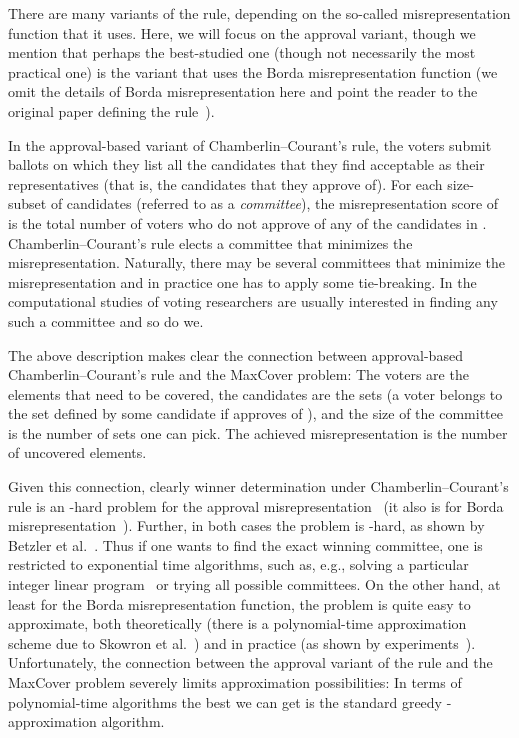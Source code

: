 \documentclass[11pt]{article}
\begin{document}
There are many variants of the rule, depending on the so-called
misrepresentation function that it uses. Here, we will focus on the
approval variant, though we mention that perhaps the best-studied one
(though not necessarily the most practical one) is the variant that
uses the Borda misrepresentation function (we omit the details of
Borda misrepresentation here and point the reader to the original
paper defining the rule~\cite{ccElection}).

In the approval-based variant of Chamberlin--Courant's rule, the
voters submit ballots on which they list all the candidates that they
find acceptable as their representatives (that is, the candidates that
they approve of). For each size- subset  of candidates (referred
to as a \emph{committee}), the misrepresentation score of  is the
total number of voters who do not approve of any of the candidates in
. Chamberlin--Courant's rule elects a committee  that minimizes
the misrepresentation.  Naturally, there may be several committees
that minimize the misrepresentation and in practice one has to apply
some tie-breaking. In the computational studies of voting researchers
are usually interested in finding any such a committee and so do we.

The above description makes clear the connection between
approval-based Chamberlin--Courant's rule and the MaxCover problem:
The voters are the elements that need to be covered, the candidates
are the sets (a voter  belongs to the set defined by some candidate
 if  approves of ), and the size of the committee is the
number of sets one can pick. The achieved misrepresentation is the
number of uncovered elements.

Given this connection, clearly winner determination under
Chamberlin--Courant's rule is an -hard problem for the approval
misrepresentation~\cite{complexityProportionalRepr} (it also is for
Borda misrepresentation~\cite{budgetSocialChoice}). Further, in both
cases the problem is -hard, as shown by Betzler et
al.~\cite{fullyProportionalRepr}.  Thus if one wants to find the exact
winning committee, one is restricted to exponential time algorithms,
such as, e.g., solving a particular integer linear
program~\cite{potthoff-brams} or trying all possible committees.  On
the other hand, at least for the Borda misrepresentation function, the
problem is quite easy to approximate, both theoretically (there is a
polynomial-time approximation scheme due to Skowron et
al.~\cite{sko-fal-sli:c:multiwinner}) and in practice (as shown by
experiments~\cite{sko-fal-sli:c:monroe-cc-experimental}).
Unfortunately, the connection between the approval variant of the rule
and the MaxCover problem severely limits approximation possibilities:
In terms of polynomial-time algorithms the best we can get is the
standard greedy -approximation algorithm.
\end{document}
